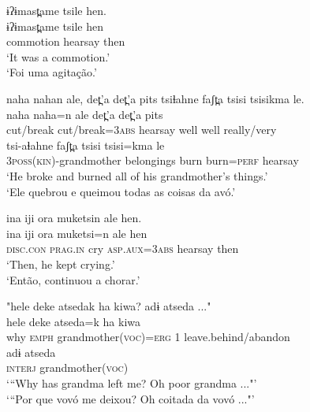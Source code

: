 \documentclass[output=paper,
modfonts,nonflat
]{langsci/langscibook}
\begin{document}
\ea	ɨʔɨmast̪ame tsile hen.\\[.3em]
\gll ɨʔɨmast̪ame  tsile        hen\\
commotion  hearsay  then\\	
\glt ‘It was a commotion.'\\
‘Foi uma agitação.’
\z

\ea naha nahan ale, det̪'a det̪'a pits tsiɬahne faʃt̪a tsisi tsisikma le.\\[.3em]
\gll naha           naha=n              ale          det̪'a det̪'a  pits\\            
cut/break    cut/break=\textsc{3abs} hearsay  well   well   really/very\\     



\gll tsi-aɬahne                         faʃt̪a            tsisi   tsisi=kma    le\\
\textsc{3poss(kin)}-grandmother  belongings  burn  burn=\textsc{perf}  hearsay\\
\glt ‘He broke and burned all of his grandmother's things.'\\
‘Ele quebrou e queimou todas as coisas da avó.’
\z

\newpage 
\ea ina iji ora muketsin ale hen.\\[.3em]
\gll ina           iji          ora   muketsi=n            ale          hen\\
\textsc{disc.con}  \textsc{prag.in}  cry   \textsc{asp.aux}=\textsc{3abs}     hearsay  then\\
\glt ‘Then, he kept crying.'\\
‘Então, continuou a chorar.’{\footnotemark} 
\z

  
\ea "hele deke atsedak ha kiwa? adɨ atseda ..."\\[.3em]
\gll hele deke    atseda=k  ha  kiwa\\  
why  \textsc{emph} grandmother(\textsc{voc})=\textsc{erg} 1 leave.behind/abandon\\



\gll adɨ     atseda\\            
 \textsc{interj}  grandmother(\textsc{voc})\\
\glt ‘“Why has grandma left me? Oh poor grandma ..."'\\
‘“Por que vovó me deixou? Oh coitada da vovó ..."'
\z
\end{document}

